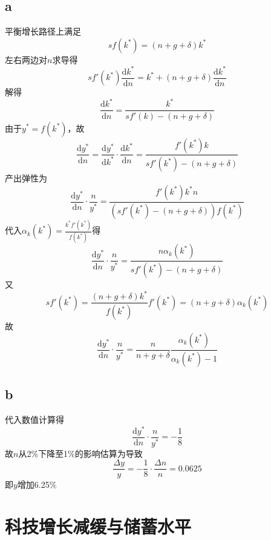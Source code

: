 \documentclass[a4paper,12pt]{ctexart}
\begin{document}
\subsection*{a}\label{sec:a}
平衡增长路径上满足
\begin{equation*}
    sf(k^*)=(n+g+\delta) k^*
\end{equation*}
左右两边对$n$求导得
\begin{equation*}
    sf'(k^*) \frac{\mathrm{d}k^*}{\mathrm{d}n}=k^*+(n+g+\delta)\frac{\mathrm{d}k^*}{\mathrm{d}n}
\end{equation*}
解得
\begin{equation*}
    \frac{\mathrm{d}k^*}{\mathrm{d}n}=\frac{k^*}{sf'(k)-(n+g+\delta)}
\end{equation*}
由于$y^*=f(k^*)$，故
\begin{equation*}
    \frac{\mathrm{d}y^*}{\mathrm{d}n}=\frac{\mathrm{d}y^*}{\mathrm{d}k^*}\cdot\frac{\mathrm{d}k^*}{\mathrm{d}n}=\frac{f'(k^*)k}{sf'(k^*)-(n+g+\delta)}
\end{equation*}
产出弹性为
\begin{equation*}
    \frac{\mathrm{d}y^*}{\mathrm{d}n}\cdot\frac{n}{y^*}=\frac{f'(k^*)k^*n}{(sf'(k^*)-(n+g+\delta))f(k^*)}
\end{equation*}
代入$\alpha_k(k^*)=\displaystyle \frac{k^*f'(k^*)}{f(k^*)}$得
\begin{equation*}
    \frac{\mathrm{d}y^*}{\mathrm{d}n}\cdot\frac{n}{y^*}=\frac{n \alpha_k(k^*)}{sf'(k^*)-(n+g+\delta)}
\end{equation*}
又
\begin{equation*}
    sf'(k^*)=\frac{(n+g+\delta)k^*}{f(k^*)}f'(k^*)=(n+g+\delta)\alpha_k(k^*)
\end{equation*}
故
\begin{equation*}
    \frac{\mathrm{d}y^*}{\mathrm{d}n}\cdot\frac{n}{y^*}=\frac{n}{n+g+\delta}\frac{\alpha_k(k^*)}{\alpha_k(k^*)-1}
\end{equation*}
\subsection*{b}
代入数值计算得
\begin{equation*}
    \frac{\mathrm{d}y^*}{\mathrm{d}n}\cdot\frac{n}{y^*}=-\frac{1}{8}
\end{equation*}
故$n$从2\%下降至1\%的影响估算为导致
\begin{equation*}
    \frac{\Delta y}{y}=-\frac{1}{8}\cdot \frac{\Delta n}{n}=0.0625
\end{equation*}
即$y$增加6.25\%
\section{科技增长减缓与储蓄水平}
\end{document}
